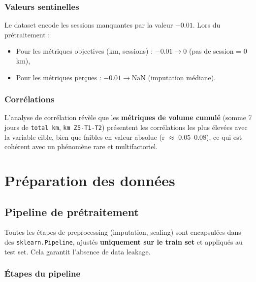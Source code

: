 \documentclass[12pt,a4paper]{report}
\begin{document}
\subsection{Valeurs sentinelles}

Le dataset encode les sessions manquantes par la valeur $-0.01$. Lors du prétraitement :
\begin{itemize}
  \item Pour les métriques objectives (km, sessions) : $-0.01 \rightarrow 0$ (pas de session = 0 km),
  \item Pour les métriques perçues : $-0.01 \rightarrow \text{NaN}$ (imputation médiane).
\end{itemize}

\subsection{Corrélations}

L'analyse de corrélation révèle que les \textbf{métriques de volume cumulé} (somme 7 jours de
\texttt{total km}, \texttt{km Z5-T1-T2}) présentent les corrélations les plus élevées avec la
variable cible, bien que faibles en valeur absolue (r $\approx$ 0.05--0.08), ce qui est cohérent
avec un phénomène rare et multifactoriel.

\chapter{Préparation des données}

\section{Pipeline de prétraitement}

\begin{infobox}[title=Anti data-leakage]
Toutes les étapes de preprocessing (imputation, scaling) sont encapsulées dans des
\texttt{sklearn.Pipeline}, ajustés \textbf{uniquement sur le train set} et appliqués au
test set. Cela garantit l'absence de data leakage.
\end{infobox}

\subsection{Étapes du pipeline}
\end{document}
